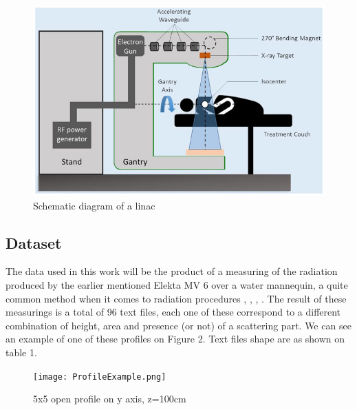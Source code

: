 \documentclass[openany]{article}
\begin{document}
\begin{figure}[!h]
    \centering
    \includegraphics[width=\textwidth]{fcvm-07-00108-g0003.jpg}
    \caption{Schematic diagram of a linac \cite{Jumeau}}
    \label{fig:my_label}
\end{figure}





\subsection{Dataset}

The data used in this work will be the product of a measuring of the radiation produced by the earlier mentioned Elekta MV 6 over a water mannequin, a quite common method when it comes to radiation procedures \cite{Lutz1984-ex}, \cite{BenitesR2012}, \cite{Gonzalez2015}, \cite{Tessonnier} . The result of these measurings is a total of 96 text files, each one of these correspond to a different combination of height, area and presence (or not) of a scattering part. We can see an example of one of these profiles on Figure 2. Text files shape are as shown on table 1.


\begin{figure}[!h]
    \centering
    \texttt{[image: ProfileExample.png]}
    \caption{5x5 open profile on y axis, z=100cm}
    \label{fig:my_label}
\end{figure}
\end{document}
